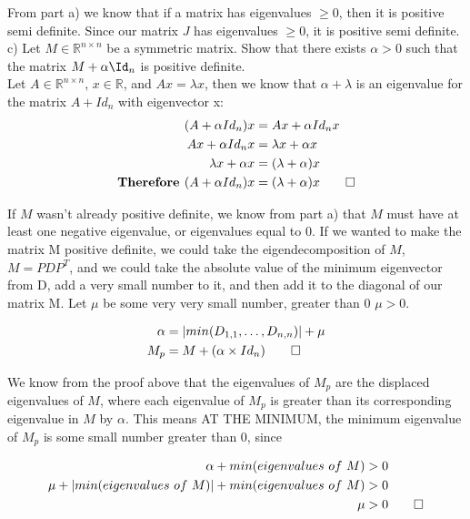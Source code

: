 \documentclass[12pt,twoside]{article}
\newcommand{\R}{\mathbb{R}}
\begin{document}
From part a) we know that if a matrix has eigenvalues $\geq 0$, then it is positive semi definite. Since our matrix $J$ has eigenvalues $\geq 0$, it is positive semi definite. \\

c) Let $M \in \R^{n \times n}$ be a symmetric matrix. Show that there exists $\alpha > 0$ such that the matrix $M + \alpha \Id_n$ is positive definite. \\

Let $A\in \R^{n\times n}$, $x \in \R$, and $Ax=\lambda x$, then we know that $\alpha + \lambda$ is an eigenvalue for the matrix $A + Id_n$ with eigenvector x:
\begin{equation}
    \begin{split}
        (A+\alpha Id_n)x &= Ax+\alpha Id_n x\\
        Ax+\alpha Id_n x &=  \lambda x + \alpha x \\
        \lambda x + \alpha x &= (\lambda + \alpha )x \\ 
       \textbf{Therefore } (A+\alpha Id_n)x &= (\lambda + \alpha )x  \qed
    \end{split}
\end{equation}

If $M$ wasn't already positive definite, we know from part a) that $M$ must have at least one negative eigenvalue, or eigenvalues equal to 0. If we wanted to make the matrix M positive definite, we could take the eigendecomposition of $M$, $M=PDP^T$, and we could take the absolute value of the minimum eigenvector from D, add a very small number to it, and then add it to the diagonal of our matrix M. Let $\mu$ be some very very small number, greater than 0 $\mu >0$.

\begin{equation}
\begin{split}
    \alpha &= | min(D_{1,1},\dots,D_{n,n}) | + \mu\\
     M_p &= M+(\alpha \times Id_n) \qed
\end{split}
\end{equation}

We know from the proof above that the eigenvalues of $M_p$ are the displaced eigenvalues of $M$, where each eigenvalue of $M_p$ is greater than its corresponding eigenvalue in $M$ by $\alpha$. This means AT THE MINIMUM, the minimum eigenvalue of $M_p$ is some small number greater than 0, since 

\begin{equation}
    \begin{split}
        \alpha + min(eigenvalues \ of \  M) & > 0 \\
        \mu + |min(eigenvalues \ of \  M)| + min(eigenvalues \ of \  M) &> 0\\
        \mu &>0 \qed
    \end{split}
\end{equation}
\end{document}
